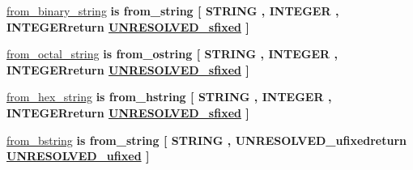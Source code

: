 \begin{DoxyCompactItemize}
\hyperlink{classfixed__pkg_ae4aecc377c66b9a720d8f2f1387aedfc}{from\+\_\+binary\+\_\+string}  {\bfseries {\bfseries \textcolor{keywordflow}{is}\textcolor{vhdlchar}{ }\textcolor{vhdlchar}{from\+\_\+string}\textcolor{vhdlchar}{ }\textcolor{vhdlchar}{\mbox{[}}\textcolor{vhdlchar}{ }\textcolor{comment}{S\+T\+R\+I\+N\+G}\textcolor{vhdlchar}{ }\textcolor{vhdlchar}{,}\textcolor{vhdlchar}{ }\textcolor{comment}{I\+N\+T\+E\+G\+E\+R}\textcolor{vhdlchar}{ }\textcolor{vhdlchar}{,}\textcolor{vhdlchar}{ }\textcolor{vhdlchar}{I\+N\+T\+E\+G\+E\+Rreturn}\textcolor{vhdlchar}{ }{\bfseries \hyperlink{classfixed__pkg_aa723b28a027c3c0f9bca02d75e8df4d6}{U\+N\+R\+E\+S\+O\+L\+V\+E\+D\+\_\+sfixed}} \textcolor{vhdlchar}{ }\textcolor{vhdlchar}{\mbox{]}}\textcolor{vhdlchar}{ }}} {\bfseries \textcolor{vhdlchar}{ }} 
\item 
\hyperlink{classfixed__pkg_a77ae4ce46a979e96c632a390accfe9f8}{from\+\_\+octal\+\_\+string}  {\bfseries {\bfseries \textcolor{keywordflow}{is}\textcolor{vhdlchar}{ }\textcolor{vhdlchar}{from\+\_\+ostring}\textcolor{vhdlchar}{ }\textcolor{vhdlchar}{\mbox{[}}\textcolor{vhdlchar}{ }\textcolor{comment}{S\+T\+R\+I\+N\+G}\textcolor{vhdlchar}{ }\textcolor{vhdlchar}{,}\textcolor{vhdlchar}{ }\textcolor{comment}{I\+N\+T\+E\+G\+E\+R}\textcolor{vhdlchar}{ }\textcolor{vhdlchar}{,}\textcolor{vhdlchar}{ }\textcolor{vhdlchar}{I\+N\+T\+E\+G\+E\+Rreturn}\textcolor{vhdlchar}{ }{\bfseries \hyperlink{classfixed__pkg_aa723b28a027c3c0f9bca02d75e8df4d6}{U\+N\+R\+E\+S\+O\+L\+V\+E\+D\+\_\+sfixed}} \textcolor{vhdlchar}{ }\textcolor{vhdlchar}{\mbox{]}}\textcolor{vhdlchar}{ }}} {\bfseries \textcolor{vhdlchar}{ }} 
\item 
\hyperlink{classfixed__pkg_a741c442bc1dbeb9419d264c76b8dbac2}{from\+\_\+hex\+\_\+string}  {\bfseries {\bfseries \textcolor{keywordflow}{is}\textcolor{vhdlchar}{ }\textcolor{vhdlchar}{from\+\_\+hstring}\textcolor{vhdlchar}{ }\textcolor{vhdlchar}{\mbox{[}}\textcolor{vhdlchar}{ }\textcolor{comment}{S\+T\+R\+I\+N\+G}\textcolor{vhdlchar}{ }\textcolor{vhdlchar}{,}\textcolor{vhdlchar}{ }\textcolor{comment}{I\+N\+T\+E\+G\+E\+R}\textcolor{vhdlchar}{ }\textcolor{vhdlchar}{,}\textcolor{vhdlchar}{ }\textcolor{vhdlchar}{I\+N\+T\+E\+G\+E\+Rreturn}\textcolor{vhdlchar}{ }{\bfseries \hyperlink{classfixed__pkg_aa723b28a027c3c0f9bca02d75e8df4d6}{U\+N\+R\+E\+S\+O\+L\+V\+E\+D\+\_\+sfixed}} \textcolor{vhdlchar}{ }\textcolor{vhdlchar}{\mbox{]}}\textcolor{vhdlchar}{ }}} {\bfseries \textcolor{vhdlchar}{ }} 
\item 
\hyperlink{classfixed__pkg_a75662d795197c31b5987068ea5454087}{from\+\_\+bstring}  {\bfseries {\bfseries \textcolor{keywordflow}{is}\textcolor{vhdlchar}{ }\textcolor{vhdlchar}{from\+\_\+string}\textcolor{vhdlchar}{ }\textcolor{vhdlchar}{\mbox{[}}\textcolor{vhdlchar}{ }\textcolor{comment}{S\+T\+R\+I\+N\+G}\textcolor{vhdlchar}{ }\textcolor{vhdlchar}{,}\textcolor{vhdlchar}{ }\textcolor{vhdlchar}{U\+N\+R\+E\+S\+O\+L\+V\+E\+D\+\_\+ufixedreturn}\textcolor{vhdlchar}{ }{\bfseries \hyperlink{classfixed__pkg_ae78bc2b36d22f6abeac163955e8a587d}{U\+N\+R\+E\+S\+O\+L\+V\+E\+D\+\_\+ufixed}} \textcolor{vhdlchar}{ }\textcolor{vhdlchar}{\mbox{]}}\textcolor{vhdlchar}{ }}} {\bfseries \textcolor{vhdlchar}{ }} 

\end{DoxyCompactItemize}
